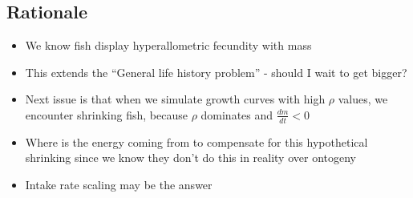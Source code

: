 \documentclass[a4paper]{article} %
\begin{document}
    \subsection{Rationale}
        \begin{itemize}
            \item We know fish display hyperallometric fecundity with mass
            \item This extends the ``General life history problem'' - should I wait to get bigger?
            \item Next issue is that when we simulate growth curves with high $\rho$ values, we encounter shrinking fish, because $\rho$ dominates and $\frac{dm}{dt} < 0$
            \item Where is the energy coming from to compensate for this hypothetical shrinking since we know they don't do this in reality over ontogeny
            \item Intake rate scaling may be the answer
        \end{itemize}
\end{document}
